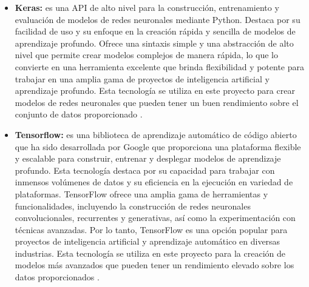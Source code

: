 \begin{itemize}
    \item \textbf{Keras:}
    es una API de alto nivel para la construcción, entrenamiento y evaluación de modelos de redes neuronales mediante Python. Destaca por su facilidad de uso y su enfoque en la creación rápida y sencilla de modelos de aprendizaje profundo. Ofrece una sintaxis simple y una abstracción de alto nivel que permite crear modelos complejos de manera rápida, lo que lo convierte en una herramienta excelente que brinda flexibilidad y potente para trabajar en una amplia gama de proyectos de inteligencia artificial y aprendizaje profundo. Esta tecnología se utiliza en este proyecto para crear modelos de redes neuronales que pueden tener un buen rendimiento sobre el conjunto de datos proporcionado \cite{keras}.

    \item \textbf{Tensorflow:}
    es una biblioteca de aprendizaje automático de código abierto que ha sido desarrollada por Google que proporciona una plataforma flexible y escalable para construir, entrenar y desplegar modelos de aprendizaje profundo. Esta tecnología destaca por su capacidad para trabajar con inmensos volúmenes de datos y su eficiencia en la ejecución en variedad de plataformas. TensorFlow ofrece una amplia gama de herramientas y funcionalidades, incluyendo la construcción de redes neuronales convolucionales, recurrentes y generativas, así como la experimentación con técnicas avanzadas. Por lo tanto, TensorFlow es una opción popular para proyectos de inteligencia artificial y aprendizaje automático en diversas industrias. Esta tecnología se utiliza en este proyecto para la creación de modelos más avanzados que pueden tener un rendimiento elevado sobre los datos proporcionados \cite{tensorflow}.
    
    
    \end{itemize}
